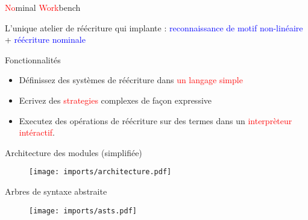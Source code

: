 \begin{frame}{\textcolor{red}{No}minal \textcolor{red}{Work}bench}

  L'unique atelier de réécriture qui implante :
  \textcolor{blue}{reconnaissance de motif non-linéaire} +
  \textcolor{blue}{réécriture nominale}

  \begin{block}{Fonctionnalités}
  \begin{itemize}
    \item Définissez des systèmes de réécriture dans \textcolor{red}{un langage simple}
    \item Ecrivez des \textcolor{red}{strategies}
      complexes de façon expressive
    \item Executez des opérations de réécriture sur des termes dans un
      \textcolor{red}{interprèteur intéractif}. 
  \end{itemize}
  \end{block}
  
\end{frame}


\begin{frame}{Architecture des modules (simplifiée)}

\begin{figure}[h]
\begin{center}
\texttt{[image: imports/architecture.pdf]}
\end{center}
\end{figure}

\end{frame}


\begin{frame}{Arbres de syntaxe abstraite}

\begin{figure}[h]
\begin{center}
\texttt{[image: imports/asts.pdf]}
\end{center}
\end{figure}

\end{frame}
